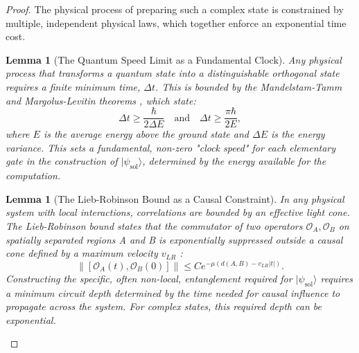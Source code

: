 \documentclass[11pt, letterpaper]{report}
\theoremstyle{plain} %
\newtheorem{lemma}[theorem]{Lemma}
\theoremstyle{definition} %
\theoremstyle{remark} %
\begin{document}
\begin{proof}
The physical process of preparing such a complex state is constrained by multiple, independent physical laws, which together enforce an exponential time cost.

\begin{lemma}[The Quantum Speed Limit as a Fundamental Clock]
\label{lemma:qsl_pnp}
Any physical process that transforms a quantum state into a distinguishable orthogonal state requires a finite minimum time, $\Delta t$. This is bounded by the Mandelstam-Tamm and Margolus-Levitin theorems \cite{MandelstamTamm1945, MargolusLevitin1998}, which state:
\begin{equation}
    \Delta t \ge \frac{\hbar}{2\Delta E} \quad \text{and} \quad \Delta t \ge \frac{\pi\hbar}{2E},
\end{equation}
where $E$ is the average energy above the ground state and $\Delta E$ is the energy variance. This sets a fundamental, non-zero "clock speed" for each elementary gate in the construction of $|\psi_{\text{sol}}\rangle$, determined by the energy available for the computation.
\end{lemma}

\begin{lemma}[The Lieb-Robinson Bound as a Causal Constraint]
\label{lemma:lieb_robinson_pnp}
In any physical system with local interactions, correlations are bounded by an effective light cone. The Lieb-Robinson bound states that the commutator of two operators $\mathcal{O}_A, \mathcal{O}_B$ on spatially separated regions A and B is exponentially suppressed outside a causal cone defined by a maximum velocity $v_{LR}$ \cite{LiebRobinson1972}:
\begin{equation}
    \|[\mathcal{O}_A(t), \mathcal{O}_B(0)]\| \le C e^{-\mu(d(A,B)-v_{LR}|t|)}.
\end{equation}
Constructing the specific, often non-local, entanglement required for $|\psi_{\text{sol}}\rangle$ requires a minimum circuit depth determined by the time needed for causal influence to propagate across the system. For complex states, this required depth can be exponential.
\end{lemma}


\end{proof}
\end{document}
